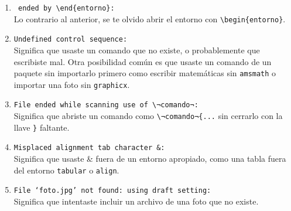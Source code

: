 \begin{enumerate}
	\item \verb| ended by \end{entorno}:| \\
		Lo contrario al anterior, se te olvido abrir el entorno con \verb|\begin{entorno}|.

	\item \texttt{Undefined control sequence:} \\
		Significa que usaste un comando que no existe, o probablemente que escribiste mal.
		Otra posibilidad común es que usaste un comando de un paquete sin importarlo primero como escribir matemáticas sin \texttt{amsmath}
		o importar una foto sin \texttt{graphicx}. 

	\item \texttt{File ended while scanning use of \lstinline|\¬comando¬|:} \\
		Significa que abriste un comando como \lstinline|\¬comando¬{...| sin cerrarlo con la llave \lstinline|}| faltante.

	\item \texttt{Misplaced alignment tab character \&:} \\
		Significa que usaste \& fuera de un entorno apropiado, como una tabla fuera del entorno \texttt{tabular} o \texttt{align}.

	\item \texttt{File `\textit{foto.jpg}' not found: using draft setting:} \\
		Significa que intentaste incluir un archivo de una foto que no existe.
\end{enumerate}
